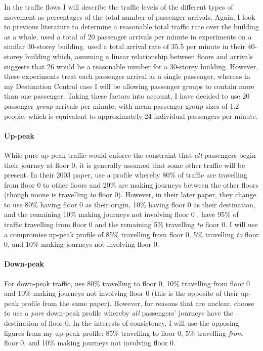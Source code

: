 \documentclass{UoYCSproject}
\begin{document}
In the traffic flows I will describe the traffic levels of the different types of movement as percentages of the total number of passenger arrivals.  Again, I look to previous literature to determine a reasonable total traffic rate over the building as a whole.  \citet{Siikonen1993} used a total of 20 passenger arrivals per minute in experiments on a similar 30-storey building.  \citet{Rong2003} used a total arrival rate of 35.5 per minute in their 40-storey building which, assuming a linear relationship between floors and arrivals suggests that 26 would be a reasonable number for a 30-storey building.  However, these experiments treat each passenger arrival as a single passenger, whereas in my Destination Control case I will be allowing passenger groups to contain more than one passenger.  Taking these factors into account, I have decided to use 20 passenger \textit{group} arrivals per minute, with mean passenger group sizes of 1.2 people, which is equivalent to approximately 24 individual passengers per minute.

\paragraph{Up-peak}

While pure up-peak traffic would enforce the constraint that \textit{all} passengers begin their journey at floor 0, it is generally assumed that some other traffic will be present.  In their 2003 paper, \citet{Nikovski2003} use a profile whereby 80\% of traffic are travelling from floor 0 to other floors and 20\% are making journeys between the other floors (though noone is travelling \textit{to} floor 0).  However, in their later paper, they change to use 80\% having floor 0 as their origin, 10\% having floor 0 as their destination, and the remaining 10\% making journeys not involving floor 0 \citep{Brand2004}.  \citet{Rong2003} have 95\% of traffic travelling from floor 0 and the remaining 5\% travelling \textit{to} floor 0.  I will use a compromise up-peak profile of 85\% travelling from floor 0, 5\% travelling \textit{to} floor 0, and 10\% making journeys not involving floor 0.

\paragraph{Down-peak}

For down-peak traffic, \citet{Brand2004} use 80\% travelling to floor 0, 10\% travelling from floor 0 and 10\% making journeys not involving floor 0 (this is the opposite of their up-peak profile from the same paper).  However, for reasons that are unclear, \citet{Rong2003} choose to use a \textit{pure} down-peak profile whereby \textit{all} passengers' journeys have the destination of floor 0.  In the interests of consistency, I will use the opposing figures from my up-peak profile: 85\% travelling to floor 0, 5\% travelling \textit{from} floor 0, and 10\% making journeys not involving floor 0.
\end{document}
